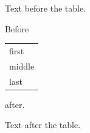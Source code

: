 \documentclass[12pt]{article}
\begin{document}
Text before the table.

Before \begin{tabular}{l}first\\middle\\last\end{tabular} after.

Text after the table.
\end{document}
